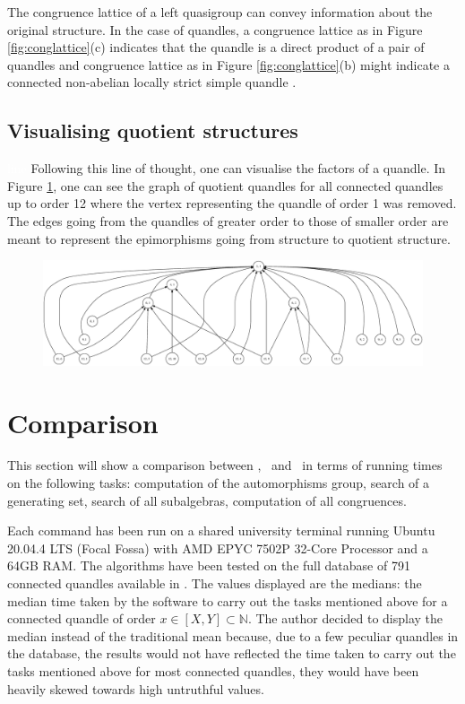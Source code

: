 \newpage\noindent The congruence lattice of a left quasigroup can convey information about the original structure. In the case of quandles, a congruence lattice as in Figure \ref{fig:conglattice}(c) indicates that the quandle is a direct product of a pair of quandles and congruence lattice as in Figure \ref{fig:conglattice}(b) might indicate a connected non-abelian locally strict simple quandle \cite{bonatto2022connected}.

\subsection{Visualising quotient structures}\textcolor{white}{line}\newline
\noindent Following this line of thought, one can visualise the factors of a quandle. \newline In Figure \ref{fig:qquandle}, one can see the graph of quotient quandles for all connected quandles up to order 12 where the vertex representing the quandle of order 1 was removed. The edges going from the quandles of greater order to those of smaller order are meant to represent the epimorphisms going from structure to quotient structure.
\begin{figure}[H]
    \centering
    \includegraphics[scale = 0.25, angle=90]{Thesis/images/BigConnectedQuoQuandle.eps}
    \caption{}
    \label{fig:qquandle}
\end{figure}
\section{Comparison}
\noindent This section will show a comparison between \Software, \rig~and \cream~in terms of running times on the following tasks:  computation of the automorphisms group, search of a generating set, search of all subalgebras, computation of all congruences.

Each command has been run on a shared university terminal running Ubuntu 20.04.4 LTS (Focal Fossa) with AMD EPYC 7502P 32-Core Processor and a 64GB RAM. The algorithms have been tested on the full database of 791 connected quandles available in \rig. The values displayed are the medians: the median time taken by the software to carry out the tasks mentioned above for a connected quandle of order $x\in [X,Y]\subset \mathbb{N}$.\newline 
The author decided to display the median instead of the traditional mean because, due to a few peculiar quandles in the database, the results would not have reflected the time taken to carry out the tasks mentioned above for most connected quandles, they would have been heavily skewed towards high untruthful values. 



